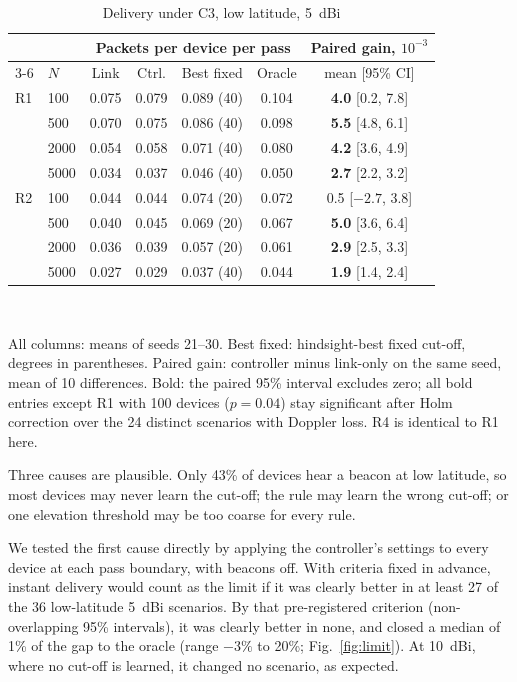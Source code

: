 \documentclass[journal]{IEEEtran}
\begin{document}
\begin{table}[t]
\centering
\caption{Delivery under C3, low latitude, 5~dBi}\label{tab:c3}
\setlength{\tabcolsep}{3pt}
\begin{tabular}{@{}llccccc@{}}
\toprule
 & & \multicolumn{4}{c}{Packets per device per pass} & Paired gain, $10^{-3}$ \\
\cmidrule(lr){3-6}
 & $N$ & Link & Ctrl. & Best fixed & Oracle & mean [95\% CI] \\
\midrule
R1 & 100  & 0.075 & 0.079 & 0.089 (40) & 0.104 & \textbf{4.0} [0.2, 7.8] \\
   & 500  & 0.070 & 0.075 & 0.086 (40) & 0.098 & \textbf{5.5} [4.8, 6.1] \\
   & 2000 & 0.054 & 0.058 & 0.071 (40) & 0.080 & \textbf{4.2} [3.6, 4.9] \\
   & 5000 & 0.034 & 0.037 & 0.046 (40) & 0.050 & \textbf{2.7} [2.2, 3.2] \\
\midrule
R2 & 100  & 0.044 & 0.044 & 0.074 (20) & 0.072 & 0.5 [$-2.7$, 3.8] \\
   & 500  & 0.040 & 0.045 & 0.069 (20) & 0.067 & \textbf{5.0} [3.6, 6.4] \\
   & 2000 & 0.036 & 0.039 & 0.057 (20) & 0.061 & \textbf{2.9} [2.5, 3.3] \\
   & 5000 & 0.027 & 0.029 & 0.037 (40) & 0.044 & \textbf{1.9} [1.4, 2.4] \\
\bottomrule
\end{tabular}
\\[2pt]
\parbox{\linewidth}{\footnotesize All columns: means of seeds 21--30. Best fixed: hindsight-best fixed cut-off, degrees in parentheses. Paired gain: controller minus link-only on the same seed, mean of 10 differences. Bold: the paired 95\% interval excludes zero; all bold entries except R1 with 100 devices ($p=0.04$) stay significant after Holm correction over the 24 distinct scenarios with Doppler loss. R4 is identical to R1 here.}
\end{table} Three causes are plausible. Only 43\% of devices hear a beacon at low latitude, so most devices may never learn the cut-off; the rule may learn the wrong cut-off; or one elevation threshold may be too coarse for every rule.

We tested the first cause directly by applying the controller's settings to every device at each pass boundary, with beacons off. With criteria fixed in advance, instant delivery would count as the limit if it was clearly better in at least 27 of the 36 low-latitude 5~dBi scenarios. By that pre-registered criterion (non-overlapping 95\% intervals), it was clearly better in none, and closed a median of 1\% of the gap to the oracle (range $-3\%$ to 20\%; Fig.~\ref{fig:limit}). At 10~dBi, where no cut-off is learned, it changed no scenario, as expected.
\end{document}
